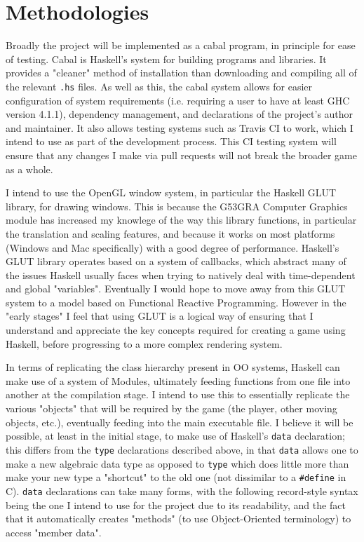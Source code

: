 \documentclass[12pt, a4paper]{report}
\begin{document}
\section{Methodologies}
Broadly the project will be implemented as a cabal program, in principle for ease of testing.
Cabal is Haskell's system for building programs and libraries\cite{cabal}.
It provides a "cleaner" method of installation than downloading and compiling all of the relevant \verb|.hs| files.
As well as this, the cabal system allows for easier configuration of system requirements (i.e. requiring a user to have at least GHC version 4.1.1), dependency management, and declarations of the project's author and maintainer.
It also allows testing systems such as Travis CI to work\cite{travisci}, which I intend to use as part of the development process.
This CI testing system will ensure that any changes I make via pull requests will not break the broader game as a whole.

\par

I intend to use the OpenGL window system, in particular the Haskell GLUT library, for drawing windows.
This is because the G53GRA Computer Graphics module has increased my knowlege of the way this library functions, in particular the translation and scaling features, and because it works on most platforms (Windows and Mac specifically) with a good degree of performance.
Haskell's GLUT library operates based on a system of callbacks\cite{glutpage}, which abstract many of the issues Haskell usually faces when trying to natively deal with time-dependent and global "variables".
Eventually I would hope to move away from this GLUT system to a model based on Functional Reactive Programming.
However in the "early stages" I feel that using GLUT is a logical way of ensuring that I understand and appreciate the key concepts required for creating a game using Haskell, before progressing to a more complex rendering system.

\par

In terms of replicating the class hierarchy present in OO systems, Haskell can make use of a system of Modules, ultimately feeding functions from one file into another at the compilation stage.
I intend to use this to essentially replicate the various "objects" that will be required by the game (the player, other moving objects, etc.), eventually feeding into the main executable file.
I believe it will be possible, at least in the initial stage, to make use of Haskell's \verb|data| declaration; this differs from the \verb|type| declarations described above, in that \verb|data| allows one to make a new algebraic data type as opposed to \verb|type| which does little more than make your new type a "shortcut" to the old one (not dissimilar to a \verb|#define| in C).
\verb|data| declarations can take many forms, with the following record-style syntax being the one I intend to use for the project due to its readability, and the fact that it automatically creates "methods" (to use Object-Oriented terminology) to access "member data".
\end{document}
